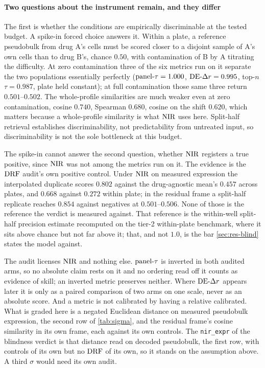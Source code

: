 \paragraph{Two questions about the instrument remain, and they differ} The first
is whether the conditions are empirically discriminable at the tested budget. A
spike-in forced choice answers it. Within a plate, a reference pseudobulk from
drug A's cells must be scored closer to a disjoint sample of A's own cells than
to drug B's, chance $0.50$, with contamination of B by A titrating the
difficulty. At zero contamination three of the six metrics run on it
separate the two populations essentially perfectly ($\textrm{panel-}\tau = 1.000$,
$\textrm{DE-}\Delta r = 0.995$, top-$n$ $\tau = 0.987$, plate held constant); at full
contamination those same three return $0.501$--$0.502$. The whole-profile
similarities are much weaker even at zero contamination, cosine $0.740$,
Spearman $0.680$, cosine on the shift $0.620$, which matters because a
whole-profile similarity is what $\textrm{NIR}$ uses here. Split-half retrieval
establishes discriminability, not predictability from untreated input, so
discriminability is not the sole bottleneck at this budget.

The spike-in cannot answer the second question, whether $\textrm{NIR}$ registers a true
positive, since $\textrm{NIR}$ was not among the metrics run on it. The evidence is the
$\textrm{DRF}$ audit's own positive control. Under $\textrm{NIR}$ on measured expression the
interpolated
duplicate scores $0.802$ against the drug-agnostic mean's $0.457$ across plates,
and $0.668$ against $0.272$ within plate; in the residual frame a split-half
replicate reaches $0.854$ against negatives at $0.501$--$0.506$. None of those is
the reference the verdict is measured against. That reference is the within-well
split-half precision estimate recomputed on the tier-2 within-plate benchmark,
where it sits above chance but not far above it; that, and not $1.0$, is the bar
\cref{sec:res-blind} states the model against.

\begin{scopelimit}
The audit licenses $\textrm{NIR}$ and nothing else. $\textrm{panel-}\tau$ is inverted in both
audited arms, so no absolute claim rests on it and no ordering read off it counts
as evidence of skill; an inverted metric preserves neither. Where $\textrm{DE-}\Delta r$
appears later it is only as a paired comparison of two arms on one scale, never
as an absolute score. And a metric is not calibrated by having a relative
calibrated. What is graded here is a negated Euclidean distance on measured
pseudobulk expression, the second row of \cref{tab:sigma}, and the residual
frame's cosine similarity in its own frame, each against its own controls. The
\texttt{nir\_expr} of the blindness verdict is that distance read on decoded
pseudobulk, the first row, with controls of its own but no $\textrm{DRF}$ of its own, so
it stands on the assumption above. A third $\sigma$ would need its own audit.
\end{scopelimit}

